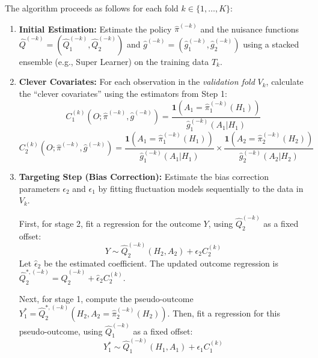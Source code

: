 \documentclass{article}
\begin{document}
	The algorithm proceeds as follows for each fold \(k \in \{1, \dots, K\}\):
	\begin{enumerate}
		\item \textbf{Initial Estimation:} Estimate the policy \(\widehat{\pi}^{(-k)}\) and the nuisance functions \(\widehat{Q}^{(-k)} = (\widehat{Q}_1^{(-k)}, \widehat{Q}_2^{(-k)})\) and \(\widehat{g}^{(-k)} = (\widehat{g}_1^{(-k)}, \widehat{g}_2^{(-k)})\) using a stacked ensemble (e.g., Super Learner) on the training data \(T_k\).

		\item \textbf{Clever Covariates:} For each observation in the \textit{validation fold} \(V_k\), calculate the ``clever covariates'' using the estimators from Step 1:
		      \[
			      C_{1}^{(k)}(O; \widehat{\pi}^{(-k)}, \widehat{g}^{(-k)}) = \frac{\mathbf{1}(A_1 = \widehat{\pi}_1^{(-k)}(H_1))}{\widehat{g}_1^{(-k)}(A_1 | H_1)}
		      \]
		      \[
			      C_{2}^{(k)}(O; \widehat{\pi}^{(-k)}, \widehat{g}^{(-k)}) = \frac{\mathbf{1}(A_1 = \widehat{\pi}_1^{(-k)}(H_1))}{\widehat{g}_1^{(-k)}(A_1 | H_1)} \times \frac{\mathbf{1}(A_2 = \widehat{\pi}_2^{(-k)}(H_2))}{\widehat{g}_2^{(-k)}(A_2 | H_2)}
		      \]

		\item \textbf{Targeting Step (Bias Correction):} Estimate the bias correction parameters \(\epsilon_2\) and \(\epsilon_1\) by fitting fluctuation models sequentially to the data in \(V_k\).

		      First, for stage 2, fit a regression for the outcome \(Y\), using \(\widehat{Q}_2^{(-k)}\) as a fixed offset:
		      \[
			      Y \sim \widehat{Q}_{2}^{(-k)}(H_2, A_2) + \epsilon_{2}C_{2}^{(k)}
		      \]
		      Let \(\widehat{\epsilon}_2\) be the estimated coefficient. The updated outcome regression is \(\widehat{Q}_{2}^{*,(-k)} = \widehat{Q}_{2}^{(-k)} + \widehat{\epsilon}_{2}C_{2}^{(k)}\).

		      Next, for stage 1, compute the pseudo-outcome \(Y^*_1 = \widehat{Q}_{2}^{*,(-k)}(H_2, A_2=\widehat{\pi}_2^{(-k)}(H_2))\). Then, fit a regression for this pseudo-outcome, using \(\widehat{Q}_1^{(-k)}\) as a fixed offset:
		      \[
			      Y^*_1 \sim \widehat{Q}_{1}^{(-k)}(H_1, A_1) + \epsilon_{1}C_{1}^{(k)}
		      \]
	\end{enumerate}
\fi
\end{document}
